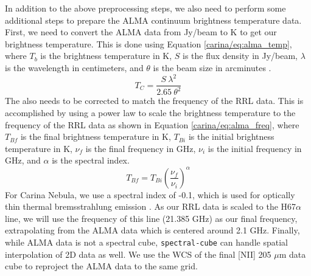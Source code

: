 In addition to the above preprocessing steps, we also need to perform some additional steps to prepare the ALMA continuum brightness temperature data.
First, we need to convert the ALMA data from Jy/beam to K to get our brightness temperature.
This is done using Equation \ref{carina/eq:alma_temp}, where $T_b$ is the brightness temperature in K, $S$ is the flux density in Jy/beam, $\lambda$ is the wavelength in centimeters, and $\theta$ is the beam size in arcminutes \parencite{rohlfs2013tools}.
\begin{equation}
    T_C = \frac{S\ \lambda^2}{2.65\ \theta^2}
    \label{carina/eq:alma_temp}
\end{equation}
The also needs to be corrected to match the frequency of the RRL data.
This is accomplished by using a power law to scale the brightness temperature to the frequency of the RRL data as shown in Equation \ref{carina/eq:alma_freq}, where $T_{Bf}$ is the final brightness temperature in K, $T_{Bi}$ is the initial brightness temperature in K, $\nu_{f}$ is the final frequency in GHz, $\nu_i$ is the initial frequency in GHz, and $\alpha$ is the spectral index.
\begin{equation}
    T_{Bf} = T_{Bi} \left( \frac{\nu_f}{\nu_i} \right)^\alpha
    \label{carina/eq:alma_freq}
\end{equation}
For Carina Nebula, we use a spectral index of -0.1, which is used for optically thin thermal bremsstrahlung emission \parencite{salatino2012spectral}.
As our RRL data is scaled to the H67$\alpha$ line, we will use the frequency of this line (21.385 GHz) as our final frequency, extrapolating from the ALMA data which is centered around 2.1 GHz.
Finally, while ALMA data is not a spectral cube, \texttt{spectral-cube} can handle spatial interpolation of 2D data as well.
We use the WCS of the final [NII] 205 $\mu$m data cube to reproject the ALMA data to the same grid.

